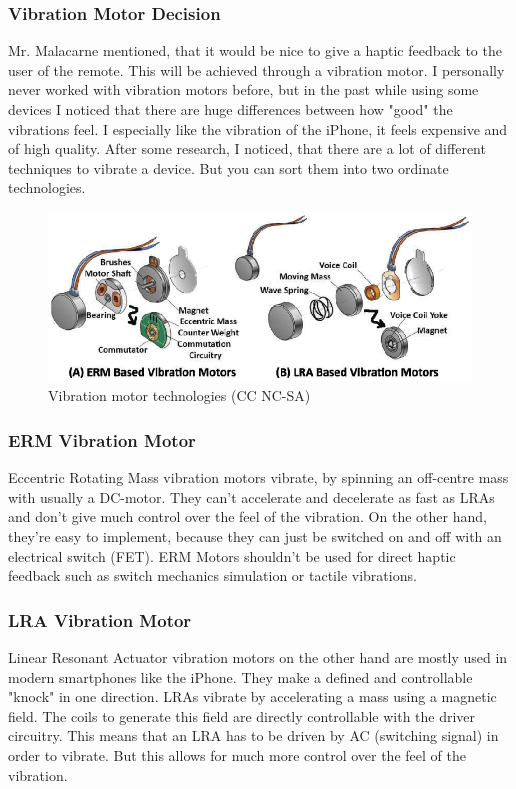 \subsubsection{Vibration Motor Decision}
\label{sssec:Vibration Motor}
Mr. Malacarne mentioned, that it would be nice to give a haptic feedback to the user of the remote. This will be achieved through a vibration motor. I personally never worked with vibration motors before, but in the past while using some devices I noticed that there are huge differences between how "good" the vibrations feel. I especially like the vibration of the iPhone, it feels expensive and of high quality. After some research, I noticed, that there are a lot of different techniques to vibrate a device. But you can sort them into two ordinate technologies. \cite{Vibration_Motors}
\begin{figure}[H]
	\centering
	\includegraphics[width=16cm]{2_Documentation/Documentation_Wireless_ScoreBoard_Remote/Resources/ERM_LRA.png}
	\caption{Vibration motor technologies (CC NC-SA)}
	\label{fig:Vibration motor technologies}
\end{figure}

\subsubsection{ERM Vibration Motor}
Eccentric Rotating Mass vibration motors vibrate, by spinning an off-centre mass with usually a DC-motor. They can't accelerate and decelerate as fast as LRAs and don't give much control over the feel of the vibration. On the other hand, they're easy to implement, because they can just be switched on and off with an electrical switch (FET). ERM Motors shouldn't be used for direct haptic feedback such as switch mechanics simulation or tactile vibrations.

\subsubsection{LRA Vibration Motor}
Linear Resonant Actuator vibration motors on the other hand are mostly used in modern smartphones like the iPhone. They make a defined and controllable "knock" in one direction. LRAs vibrate by accelerating a mass using a magnetic field. The coils to generate this field are directly controllable with the driver circuitry. This means that an LRA has to be driven by AC (switching signal) in order to vibrate. But this allows for much more control over the feel of the vibration.

